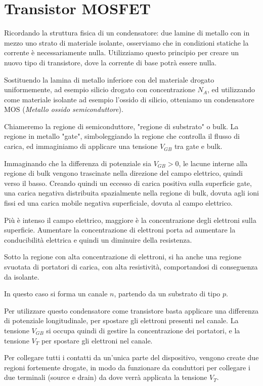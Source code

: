 \documentclass[../template]{subfiles}
\begin{document}
\section{Transistor MOSFET}
Ricordando la struttura fisica di un condensatore: due lamine di metallo con in mezzo uno strato di materiale isolante, osserviamo che in condizioni statiche la corrente è necessariamente nulla.
Utilizziamo questo principio per creare un nuovo tipo di transistore, dove la corrente di base potrà essere nulla.

Sostituendo la lamina di metallo inferiore con del materiale drogato uniformemente, ad esempio silicio drogato con concentrazione $N_A$, ed utilizzando come materiale isolante ad esempio l'ossido di silicio, otteniamo un condensatore MOS (\textit{Metallo ossido semiconduttore}).

Chiameremo la regione di semiconduttore, "regione di substrato" o bulk. La regione in metallo "gate", simboleggiando la regione che controlla il flusso di carica, ed immaginiamo di applicare una tensione $V_{GB}$ tra gate e bulk.

Immaginando che la differenza di potenziale sia $V_{GB} > 0$, le lacune interne alla regione di bulk vengono trascinate nella direzione del campo elettrico, quindi verso il basso. Creando quindi un eccesso di carica positiva sulla superficie gate, una carica negativa distribuita spazialmente nella regione di bulk, dovuta agli ioni fissi ed una carica mobile negativa superficiale, dovuta al campo elettrico.

Più è intenso il campo elettrico, maggiore è la concentrazione degli elettroni sulla superficie. Aumentare la concentrazione di elettroni porta ad aumentare la conducibilità elettrica e quindi un diminuire della resistenza.

Sotto la regione con alta concentrazione di elettroni, si ha anche una regione svuotata di portatori di carica, con alta
resistività, comportandosi di conseguenza da isolante.

In questo caso si forma un canale $n$, partendo da un substrato di tipo $p$.

Per utilizzare questo condensatore come transistore basta applicare una differenza di potenziale longitudinale, per spostare gli elettroni presenti nel canale. La tensione $V_{GB}$ si occupa quindi di gestire la concentrazione dei portatori, e la tensione $V_T$ per spostare gli elettroni nel canale.


Per collegare tutti i contatti da un'unica parte del dispositivo, vengono create due regioni fortemente drogate, in modo da funzionare da conduttori per collegare i due terminali (source e drain) da dove verrà applicata la tensione $V_T$.
\end{document}
